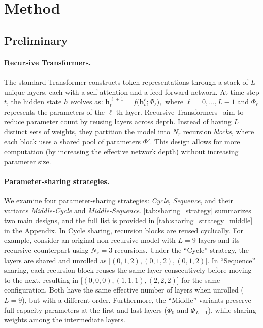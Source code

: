 \section{Method}


\subsection{Preliminary}\label{subsec:preliminary}

\paragraph{Recursive Transformers.}
The standard Transformer \citep{vaswani2017attention} constructs token representations through a stack of $L$ unique layers, each with a self-attention and a feed-forward network. At time step $t$, the hidden state $h$ evolves as: $\mathbf{h}_t^{\ell+1} = f\bigl(\mathbf{h}_t^{\ell}; \Phi_\ell\bigr),$ where $\ell = 0,\dots,L{-}1$ and $\Phi_\ell$ represents the parameters of the $\ell$-th layer.
Recursive Transformers~\citep{bae2024relaxed, fan2024looped, giannou2023looped, yang2023looped, saunshi2025reasoning} aim to reduce parameter count by reusing layers across depth. Instead of having $L$ distinct sets of weights, they partition the model into $N_r$ recursion \emph{blocks}, where each block uses a shared pool of parameters $\Phi'$. This design allows for more computation (by increasing the effective network depth) without increasing parameter size. 





\vspace{-10pt}
\paragraph{Parameter-sharing strategies.}
We examine four parameter-sharing strategies: \textit{Cycle}, \textit{Sequence}, and their variants \textit{Middle-Cycle} and \textit{Middle-Sequence}. \autoref{tab:sharing_strategy} summarizes two main designs, and the full list is provided in \autoref{tab:sharing_strategy_middle} in the Appendix. In Cycle sharing, recursion blocks are reused cyclically. For example, consider an original non-recursive model with $L{=}9$ layers and its recursive counterpart using $N_r{=}3$ recursions. Under the ``Cycle'' strategy, the layers are shared and unrolled as [$(0,1,2),(0,1,2),(0,1,2)$]. In ``Sequence'' sharing, each recursion block reuses the same layer consecutively before moving to the next, resulting in [$(0,0,0),(1,1,1),(2,2,2)$] for the same configuration. Both have the same effective number of layers when unrolled ($L{=}9$), but with a different order. Furthermore, the ``Middle'' variants preserve full-capacity parameters at the first and last layers ($\Phi_0$ and $\Phi_{L-1}$), while sharing weights among the intermediate layers.



